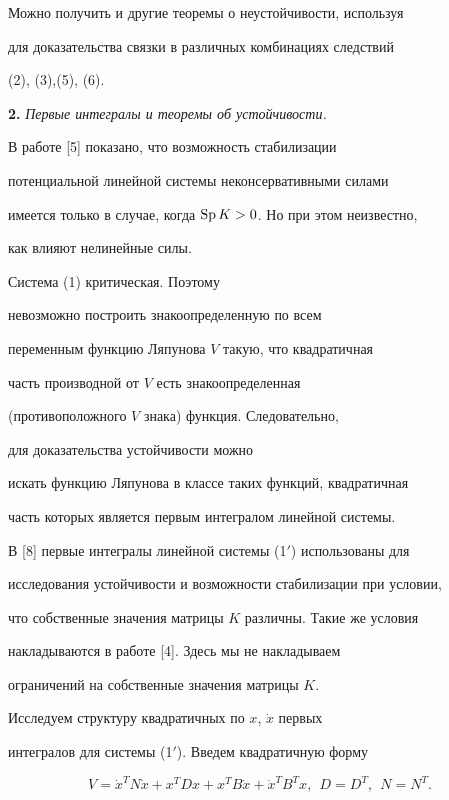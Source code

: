 Можно получить и другие теоремы о неустойчивости, используя


для доказательства связки в различных комбинациях следствий


(2), (3),(5), (6).


\medskip





{\bf 2.} {\it Первые интегралы и теоремы об устойчивости.}


В работе [5] показано, что возможность стабилизации


потенциальной линейной системы неконсервативными силами


имеется только в случае, когда $\operatorname{Sp} K>0$. Но при этом неизвестно,


как влияют нелинейные силы.


Система (1) критическая. Поэтому


невозможно построить знакоопределенную по всем


переменным функцию Ляпунова $V$ такую, что квадратичная


часть производной от $V$ есть знакоопределенная


(противоположного $V$ знака) функция. Следовательно,


для доказательства устойчивости можно


искать функцию Ляпунова в классе таких функций, квадратичная


часть которых является первым интегралом линейной системы.





В [8] первые интегралы линейной системы (1$'$) использованы для


исследования устойчивости и возможности стабилизации при условии,


что собственные значения матрицы $K$ различны. Такие же условия


накладываются в работе [4]. Здесь мы не накладываем


ограничений на собственные значения матрицы $K$.





Исследуем структуру квадратичных по $x$, $\Dot{x}$ первых


интегралов для системы (1$'$). Введем квадратичную форму


\begin{equation}


V=\Dot{x}^{T}N \Dot{x} +x^{T}Dx+x^{T}B\Dot{x}+


\Dot{x}^{T}B^{T}x ,\ \ D=D^{T},\ \ N=N^{T}. \tag{7}


\end{equation}


